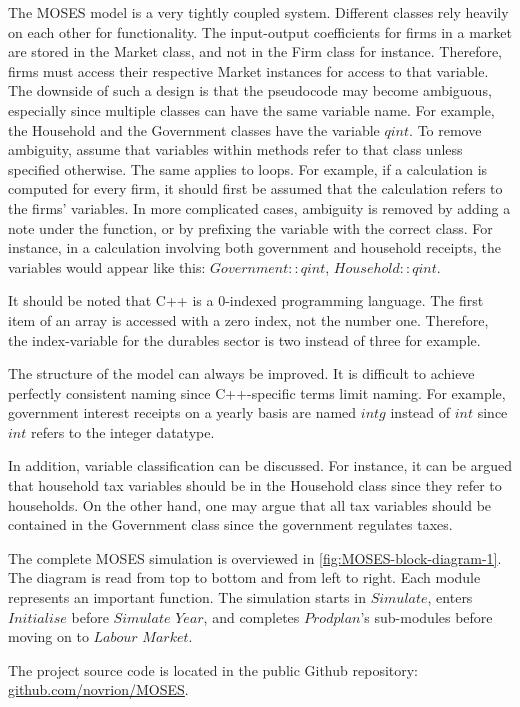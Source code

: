 \documentclass{article}
\begin{document}
The MOSES model is a very tightly coupled system. Different classes rely heavily on each other for functionality. The input-output coefficients for firms in a market are stored in the Market class, and not in the Firm class for instance. Therefore, firms must access their respective Market instances for access to that variable. The downside of such a design is that the pseudocode may become ambiguous, especially since multiple classes can have the same variable name. For example, the Household and the Government classes have the variable $qint$. To remove ambiguity, assume that variables within methods refer to that class unless specified otherwise. The same applies to loops. For example, if a calculation is computed for every firm, it should first be assumed that the calculation refers to the firms' variables. In more complicated cases, ambiguity is removed by adding a note under the function, or by prefixing the variable with the correct class. For instance, in a calculation involving both government and household receipts, the variables would appear like this: $Government::qint$, $Household::qint$.

It should be noted that C++ is a 0-indexed programming language. The first item of an array is accessed with a zero index, not the number one. Therefore, the index-variable for the durables sector is two instead of three for example.

The structure of the model can always be improved. It is difficult to achieve perfectly consistent naming since C++-specific terms limit naming. For example, government interest receipts on a yearly basis are named $intg$ instead of $int$ since $int$ refers to the integer datatype.

In addition, variable classification can be discussed. For instance, it can be argued that household tax variables should be in the Household class since they refer to households. On the other hand, one may argue that all tax variables should be contained in the Government class since the government regulates taxes.

The complete MOSES simulation is overviewed in \autoref{fig:MOSES-block-diagram-1}. The diagram is read from top to bottom and from left to right. Each module represents an important function. The simulation starts in $Simulate$, enters $Initialise$ before $Simulate$ $Year$, and completes $Prodplan$'s sub-modules before moving on to $Labour$ $Market$.

The project source code is located in the public Github repository: \href{https://github.com/novrion/MOSES}{github.com/novrion/MOSES}.
\end{document}
